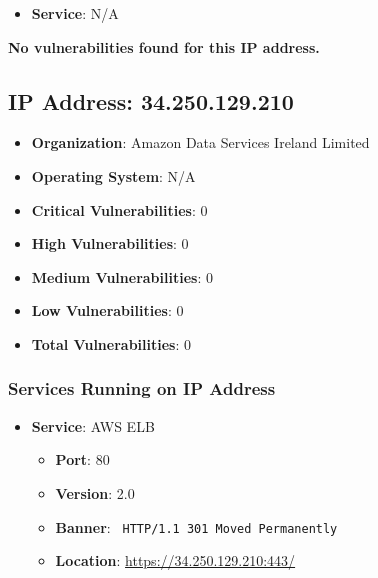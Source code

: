 \documentclass{article}
\begin{document}
\begin{itemize}
    
        \item \textbf{Service}: N/A
    
\end{itemize}


\textbf{No vulnerabilities found for this IP address.}




\clearpage



\subsection*{IP Address: 34.250.129.210}

\begin{itemize}
    \item \textbf{Organization}: Amazon Data Services Ireland Limited
    \item \textbf{Operating System}:  N/A 
    \item \textbf{Critical Vulnerabilities}: 0
    \item \textbf{High Vulnerabilities}: 0
    \item \textbf{Medium Vulnerabilities}: 0
    \item \textbf{Low Vulnerabilities}: 0
    \item \textbf{Total Vulnerabilities}: 0
\end{itemize}

\subsubsection*{Services Running on IP Address}

\begin{itemize}
    
        \item \textbf{Service}: AWS ELB
        \begin{itemize}
            \item \textbf{Port}: 80
            \item \textbf{Version}:  2.0 
            \item \textbf{Banner}: \texttt{
                HTTP/1.1 301 Moved Permanently
            }
            \item \textbf{Location}: \href{ https://34.250.129.210:443/ }{ https://34.250.129.210:443/ }
        \end{itemize}
    
\end{itemize}
\end{document}
